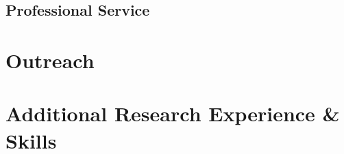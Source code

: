 \subsection*{Professional Service}


\section*{Outreach}


\section*{Additional Research Experience \& Skills}


% 

% 


